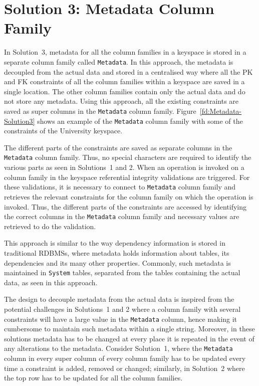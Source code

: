 \section{Solution 3:  Metadata Column Family} \label{s:design-sol3}

In Solution~3,  metadata for all the column families in a keyspace is stored in a
separate column family called \texttt{Metadata}.    In this approach,  the
metadata is decoupled from the actual data and stored in a centralised way where all the
\ac{PK} and \ac{FK} constraints of all the column families within a keyspace are
saved in a single location.   The other column families contain only the actual
data and do not store any metadata.   Using this approach,   all the existing
constraints are saved as super columns in the \texttt{Metadata} column family.  
Figure~\ref{fd:Metadata-Solution3} shows an example of the \texttt{Metadata}
column family with some of the constraints of the University keyspace. 

 	 
	

The different parts of the constraints are saved as separate columns in the
\texttt{Metadata} column family.  Thus,   no special characters are required to
identify the various parts as seen in Solutions~1 and 2.   When an operation is
invoked on a column family in the keyspace referential integrity validations are
triggered.   For these validations,   it is necessary to connect to
\texttt{Metadata} column family and retrieves the relevant constraints for the
column family on which the operation is invoked. 
Thus,  the different parts of the constraints are accessed by identifying the
correct columns in the \texttt{Metadata} column family and necessary values are
retrieved to do the validation. 

This approach is similar to the way dependency information is
stored in traditional \acp{RDBMS},   where metadata holds information
about tables,   its dependencies and its many other properties.   Commonly,   such
metadata is maintained in \texttt{System} tables,  separated from the
tables containing the actual data,  as seen in this approach.   

The design to decouple metadata from the actual data is inspired from the
potential challenges in Solutions~1 and 2 where
a column family with several constraints will have a
large value in the \texttt{Metadata} column,  hence making it cumbersome to
maintain such metadata within a single string. 
Moreover,  in these solutions metadata has to be changed at every place it is repeated in the event of any alterations to
the metadata.  
Consider Solution~1,  where the \texttt{Metadata} column in every super column
of every column family has to be updated every time a constraint is added,  
removed or changed; similarly,  in Solution~2 where the top row has to be updated
for all the column families.
 

